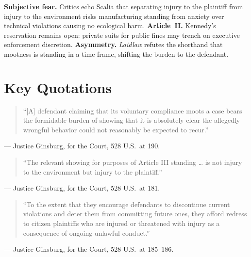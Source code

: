 \documentclass[12pt]{article}
\begin{document}
\textbf{Subjective fear.} Critics echo Scalia that separating injury to the plaintiff from injury to the environment risks manufacturing standing from anxiety over technical violations causing no ecological harm. \textbf{Article~II.} Kennedy's reservation remains open: private suits for public fines may trench on executive enforcement discretion. \textbf{Asymmetry.} \textit{Laidlaw} refutes the shorthand that mootness is standing in a time frame, shifting the burden to the defendant.

\section{Key Quotations}

\begin{quote}
``[A] defendant claiming that its voluntary compliance moots a case bears the formidable burden of showing that it is absolutely clear the allegedly wrongful behavior could not reasonably be expected to recur.''
\end{quote}
\noindent --- Justice Ginsburg, for the Court, 528 U.S.\ at 190.

\begin{quote}
``The relevant showing for purposes of Article III standing \ldots{} is not injury to the environment but injury to the plaintiff.''
\end{quote}
\noindent --- Justice Ginsburg, for the Court, 528 U.S.\ at 181.

\begin{quote}
``To the extent that they encourage defendants to discontinue current violations and deter them from committing future ones, they afford redress to citizen plaintiffs who are injured or threatened with injury as a consequence of ongoing unlawful conduct.''
\end{quote}
\noindent --- Justice Ginsburg, for the Court, 528 U.S.\ at 185--186.
\end{document}
